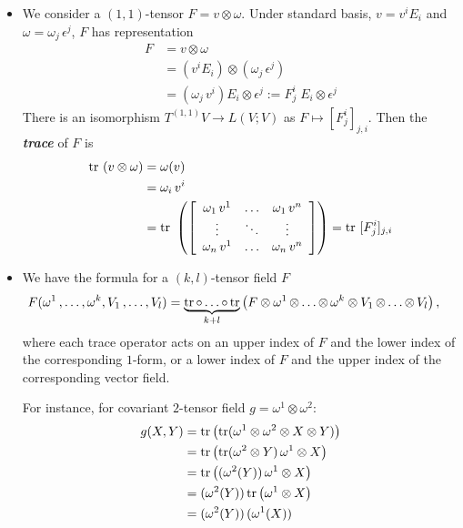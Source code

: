 \documentclass[11pt]{article}
\begin{document}
\begin{itemize}
\item \begin{remark}
We consider a $(1,1)$-tensor $F = v \otimes \omega$. Under standard basis, $v = v^i E_i$ and $\omega = \omega_j\, \epsilon^j$, $F$ has representation
\begin{align*}
 F  &= v \otimes \omega \\
 &= (v^i E_i) \otimes  (\omega_j\, \epsilon^j) \\
 &= (\omega_j\,v^i) E_i \otimes \epsilon^j := F_{j}^{i} \;E_i \otimes \epsilon^j
\end{align*} There is an isomorphism $T^{(1,1)}V \rightarrow L(V;V)$ as $F \mapsto [F_{j}^{i}]_{j,i}$.
Then the \emph{\textbf{trace}} of $F$ is 
\begin{align*}
\text{tr }(v \otimes \omega) &= \omega(v) \\
&= \omega_i \, v^i\\
&= \text{tr }\left(\left[\begin{array}{ccc}
\omega_1 \, v^1 & \ldots & \omega_1 \, v^n\\
\vdots & \ddots & \vdots \\
\omega_n \, v^1 & \ldots & \omega_n \, v^n
\end{array}
\right]\right) = \text{tr }[F_{j}^{i}]_{j,i}
\end{align*}
\end{remark}

\item \begin{remark}
We have the formula for a $(k,l)$-tensor field $F$
\begin{align}
F(\omega^1 \,{,}\ldots{,}\, \omega^k, V_1 \,{,}\ldots{,}\, V_{l}) &= \underbrace{\text{tr}\,{\circ}\ldots{\circ}\, \text{tr}}_{k+l}\left(F \otimes \omega^1 \,{\otimes}\ldots{\otimes}\, \omega^k \otimes V_1 \,{\otimes}\ldots{\otimes}\, V_l\right), \label{eqn: tensor_trace_computation}
\end{align} where each trace operator acts on an upper index of $F$ and the lower index of the corresponding $1$-form, or a lower index of $F$ and the upper index of the corresponding vector field.

For instance, for covariant $2$-tensor field $g =\omega^1 \otimes \omega^2$:
\begin{align*}
g(X, Y) &= \text{tr}\left(\text{tr}(\omega^1 \otimes \omega^2 \otimes X \otimes Y )\right) \\
&= \text{tr}\left(\text{tr}(\omega^2 \otimes Y)\, \omega^1 \otimes X\right) \\
&= \text{tr}\left((\omega^2(Y))\, \omega^1 \otimes X\right) \\
&= (\omega^2(Y))\,\text{tr}\left(\omega^1 \otimes X\right) \\
&= (\omega^2(Y))\,(\omega^1(X))\,
\end{align*}
\end{remark}
\end{itemize}
\end{document}
